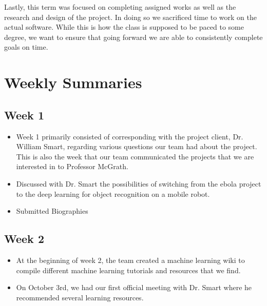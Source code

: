 \documentclass[draftclsnofoot, onecolumn, 10pt, compsoc]{IEEEtran}
\begin{document}
Lastly, this term was focused on completing assigned works as well as the research and design of the project. In doing so we sacrificed time to work on the actual software. While this is how the class is supposed to be paced to some degree, we want to ensure that going forward we are able to consistently complete goals on time. 

\newpage
\section{Weekly Summaries}

\subsection{Week 1}
  \begin{itemize}
      \item Week 1 primarily consisted of corresponding with the project client, Dr. William Smart, regarding various questions our team had about the project. This is also the week that our team communicated the projects that we are interested in to Professor McGrath.
      \item Discussed with Dr. Smart the possibilities of switching from the ebola project to the deep learning for object recognition on a mobile robot. 
      \item Submitted Biographies
  \end{itemize}
  
\subsection{Week 2}
  \begin{itemize}
      \item At the beginning of week 2, the team created a machine learning wiki to compile different machine learning tutorials and resources that we find. 
      \item On October 3rd, we had our first official meeting with Dr. Smart where he recommended several learning resources.
  \end{itemize}
  
\end{document}
